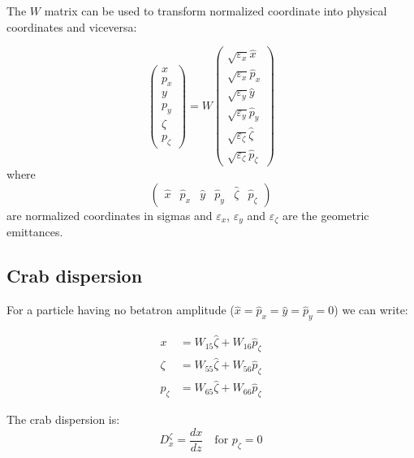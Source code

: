 The $W$ matrix can be used to transform normalized coordinate into physical coordinates and viceversa:

\begin{equation}
\left(\begin{array}{l}
x \\
p_x \\
y \\
p_y \\
\zeta \\
p_\zeta
\end{array}\right)=W\left(\begin{array}{l}
\sqrt{\varepsilon_x} \hat{x} \\
\sqrt{\varepsilon_x} \hat{p}_x \\
\sqrt{\varepsilon_y} \hat{y} \\
\sqrt{\varepsilon_y} \hat{p}_y \\
\sqrt{\varepsilon_\zeta} \hat{\zeta} \\
\sqrt{\varepsilon_\zeta} \hat{p}_\zeta
\end{array}\right)
\end{equation}
where 
\begin{equation}
\left(\begin{array}{llllll}\hat{x} & \hat{p}_x & \hat{y} & \hat{p}_y & \hat{\zeta} & \hat{p}_\zeta\end{array}\right)
\end{equation}
are normalized coordinates in sigmas and $\varepsilon_x$, $\varepsilon_y$ and $\varepsilon_\zeta$ are the geometric emittances.

\subsection{Crab dispersion}

For a particle having no betatron amplitude ($\hat{x} = \hat{p}_x =\hat{y} =\hat{p}_y=0$) we can write:

\begin{align}
x &= W_{15}\hat{\zeta} + W_{16}\hat{p}_\zeta \label{eq:crab_x}\\
\zeta &= W_{55}\hat{\zeta} + W_{56}\hat{p}_\zeta \label{eq:crab_zeta}\\
p_\zeta &= W_{65}\hat{\zeta} + W_{66}\hat{p}_\zeta \label{eq:crab_pzeta}
\end{align}

The crab dispersion is:
\begin{equation}
D_x^\zeta = \frac{dx}{dz} \quad \text{for } p_\zeta=0
\end{equation}

